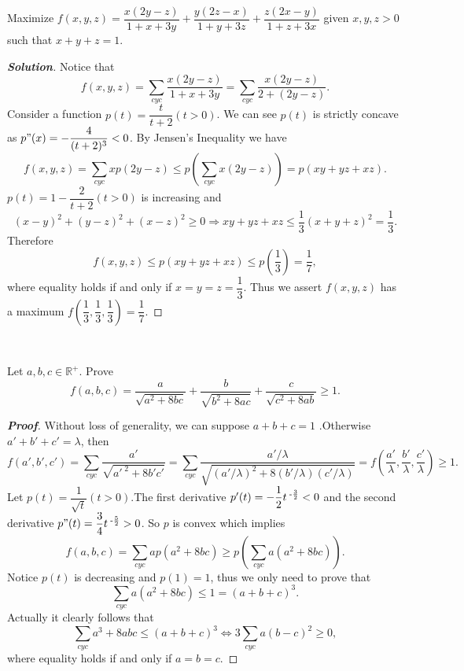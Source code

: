 \documentclass{memoir}
\begin{document}
\begin{example}
	Maximize $f(x,y,z)=\dfrac{x(2y-z)}{1+x+3y}+\dfrac{y(2z-x)}{1+y+3z}+\dfrac{z(2x-y)}{1+z+3x}$ given $ x,y,z>0 $ such that $x+y+z=1$.	\label{1.3.5}	
\end{example}
\begin{proof}[\textbf{Solution}]
	Notice that \[f(x,y,z)=\sum_{cyc}\dfrac{x(2y-z)}{1+x+3y}=\sum_{cyc}\dfrac{x(2y-z)}{2+(2y-z)}.
	\]
    Consider a function $ p(t)=\dfrac{t}{t+2}(t>0) $. We can see $ p(t) $ is strictly concave as $p"(x)=-\dfrac{4}{(t+2)^3}<0$.
    By Jensen's Inequality we have 
    \[
    f(x,y,z)=\sum_{cyc}xp(2y-z)\leqslant p\left(\sum_{cyc}x(2y-z)\right)=p\left(xy+yz+xz\right).
    \]
    $p(t)=1-\dfrac{2}{t+2}(t>0)$ is increasing and 
    \[(x-y)^2+(y-z)^2+(x-z)^2\geqslant 0 \Rightarrow xy+yz+xz\leqslant \dfrac{1}{3}(x+y+z)^2=\dfrac{1}{3}.\]
    Therefore 
    \[
    f(x,y,z)\leqslant p\left(xy+yz+xz\right)\leqslant p\left(\dfrac{1}{3}\right)=\dfrac{1}{7},
    \]
    where equality holds if and only if $x=y=z=\dfrac{1}{3}.$ Thus we assert $f(x,y,z)$ has a maximum $ f\left(\dfrac{1}{3},\dfrac{1}{3},\dfrac{1}{3}\right)=\dfrac{1}{7}. $

\end{proof}	
\par \ 	

\begin{example}
	Let $a,b,c\in \mathbb{R^+}$. Prove
	\[
	f(a,b,c)=
	\dfrac{a}{\sqrt{a^2+8bc}}+\dfrac{b}{\sqrt{b^2+8ac}}+\dfrac{c}{\sqrt{c^2+8ab}}\geqslant 1.
	\]
	
\end{example}	
\begin{proof}[\textbf{Proof}]
	Without loss of generality, we can suppose $a+b+c=1$ .Otherwise $a'+b'+c'=\lambda$, then
	\[
	f(a',b',c')=\sum_{cyc}\dfrac{a'}{\sqrt{a'^{\;2}+8b'c'}}=\sum_{cyc}\dfrac{a'/\lambda}{\sqrt{\left(a'/\lambda\right)^2+8(b'/\lambda)(c'/\lambda)}}=f\left(\dfrac{a'}{\lambda},\dfrac{b'}{\lambda},\dfrac{c'}{\lambda}\right)\geqslant 1.
	\]
	Let $ p(t)=\dfrac{1}{\sqrt{t}}(t>0) $.The first derivative $p'(t) = -\dfrac{1}{2}t^{\;\textnormal{-}\frac{3}{2}}<0$ and the second derivative $p"(t)=\dfrac{3}{4}t^{\;\textnormal{-}\frac{5}{2}}>0$. So $p$ is convex which implies
	\[
	f(a,b,c)=\sum_{cyc}ap(a^2+8bc)\geqslant p\left(\sum_{cyc}a\left(a^2+8bc\right)\right).
	\]
	Notice $p(t)$ is decreasing and $p(1)=1$, thus we only need to prove that
	\[
	\sum_{cyc}a(a^2+8bc)\leqslant 1=(a+b+c)^3.
	\] 
	Actually it clearly follows that
	\[
	\sum_{cyc}a^3+8abc\leqslant (a+b+c)^3 \iff 3\sum_{cyc}a(b-c)^2\geqslant0, 
	\]
	where  equality holds if and only if $a=b=c.$
\end{proof}		
\end{document}
